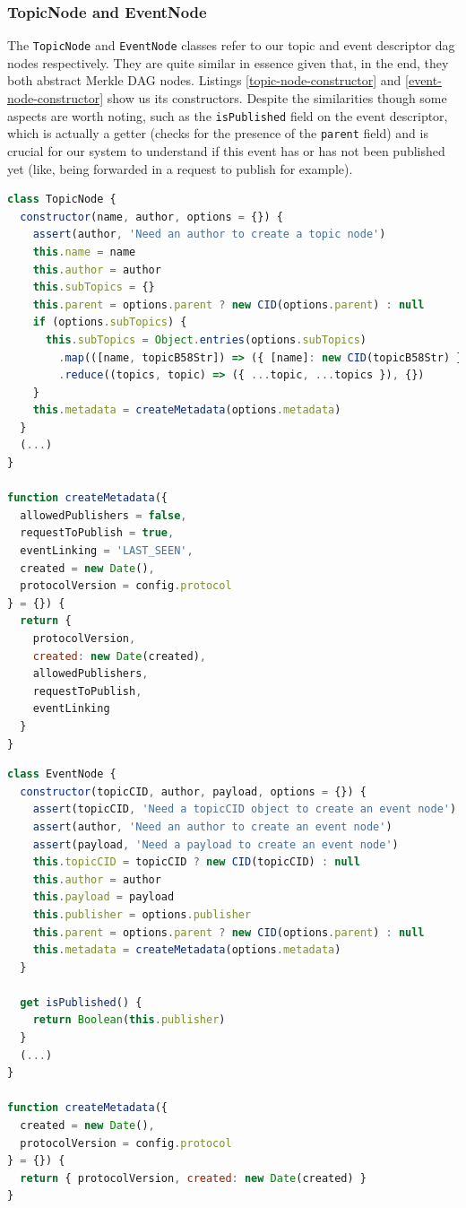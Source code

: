 \subsubsection{TopicNode and EventNode}\label{subsubsec:topic-node}

The \verb|TopicNode| and \verb|EventNode| classes refer to our topic and event
descriptor dag nodes respectively. They are quite similar in essence given
that, in the end, they both abstract Merkle DAG nodes. Listings
\ref{topic-node-constructor} and \ref{event-node-constructor} show us its
constructors. Despite the similarities though some aspects are worth noting,
such as the \verb|isPublished| field on the event descriptor, which is actually
a getter (checks for the presence of the \verb|parent| field) and is crucial
for our system to understand if this event has or has not been published yet
(like, being forwarded in a request to publish for example).

\begin{lstlisting}[language=JavaScript, float=p, caption={TopicNode class constructor},label={topic-node-constructor}]
class TopicNode {
  constructor(name, author, options = {}) {
    assert(author, 'Need an author to create a topic node')
    this.name = name
    this.author = author
    this.subTopics = {}
    this.parent = options.parent ? new CID(options.parent) : null
    if (options.subTopics) {
      this.subTopics = Object.entries(options.subTopics)
        .map(([name, topicB58Str]) => ({ [name]: new CID(topicB58Str) }))
        .reduce((topics, topic) => ({ ...topic, ...topics }), {})
    }
    this.metadata = createMetadata(options.metadata)
  }
  (...)
}

function createMetadata({
  allowedPublishers = false,
  requestToPublish = true,
  eventLinking = 'LAST_SEEN',
  created = new Date(),
  protocolVersion = config.protocol
} = {}) {
  return {
    protocolVersion,
    created: new Date(created),
    allowedPublishers,
    requestToPublish,
    eventLinking
  }
}
\end{lstlisting}

\begin{lstlisting}[language=JavaScript, float=p, caption={EventNode class constructor},label={event-node-constructor}]
class EventNode {
  constructor(topicCID, author, payload, options = {}) {
    assert(topicCID, 'Need a topicCID object to create an event node')
    assert(author, 'Need an author to create an event node')
    assert(payload, 'Need a payload to create an event node')
    this.topicCID = topicCID ? new CID(topicCID) : null
    this.author = author
    this.payload = payload
    this.publisher = options.publisher
    this.parent = options.parent ? new CID(options.parent) : null
    this.metadata = createMetadata(options.metadata)
  }

  get isPublished() {
    return Boolean(this.publisher)
  }
  (...)
}

function createMetadata({
  created = new Date(),
  protocolVersion = config.protocol
} = {}) {
  return { protocolVersion, created: new Date(created) }
}

\end{lstlisting}

